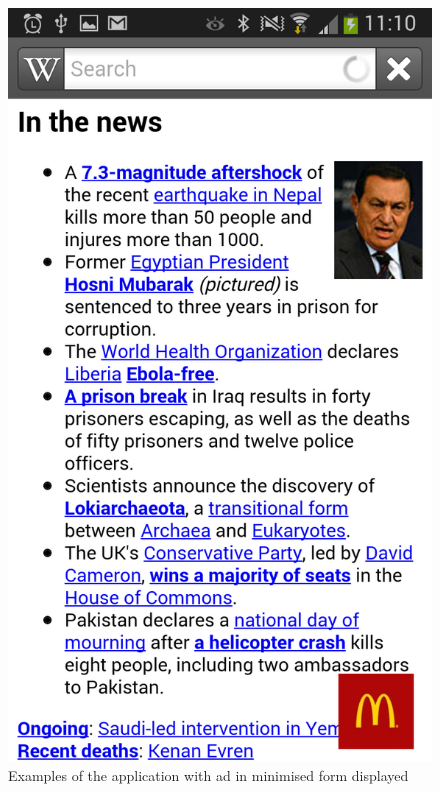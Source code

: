 \begin{figure}
\begin{center}
\includegraphics[scale=0.25]{Images/gesturead_small2.png}
\caption{Examples of the application with ad in minimised form displayed}
\end{center}
\end{figure}

